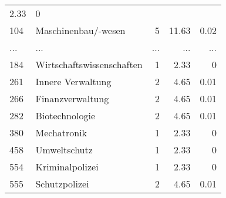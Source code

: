 \begin{longtable}{lXrrr}
          \num[round-mode=places,round-precision=2]{2.33} &
          \num[round-mode=places,round-precision=2]{0} \\
        104 & \multicolumn{1}{X}{Maschinenbau/-wesen} & %
          \num{5} &
          \num[round-mode=places,round-precision=2]{11.63} &
          \num[round-mode=places,round-precision=2]{0.02} \\
       ... & ... & ... & ... & ... \\
        184 & \multicolumn{1}{X}{Wirtschaftswissenschaften} & %
          \num{1} &
          \num[round-mode=places,round-precision=2]{2.33} &
          \num[round-mode=places,round-precision=2]{0} \\

        261 & \multicolumn{1}{X}{Innere Verwaltung} & %
          \num{2} &
          \num[round-mode=places,round-precision=2]{4.65} &
          \num[round-mode=places,round-precision=2]{0.01} \\

        266 & \multicolumn{1}{X}{Finanzverwaltung} & %
          \num{2} &
          \num[round-mode=places,round-precision=2]{4.65} &
          \num[round-mode=places,round-precision=2]{0.01} \\

        282 & \multicolumn{1}{X}{Biotechnologie} & %
          \num{2} &
          \num[round-mode=places,round-precision=2]{4.65} &
          \num[round-mode=places,round-precision=2]{0.01} \\

        380 & \multicolumn{1}{X}{Mechatronik} & %
          \num{1} &
          \num[round-mode=places,round-precision=2]{2.33} &
          \num[round-mode=places,round-precision=2]{0} \\

        458 & \multicolumn{1}{X}{Umweltschutz} & %
          \num{1} &
          \num[round-mode=places,round-precision=2]{2.33} &
          \num[round-mode=places,round-precision=2]{0} \\

        554 & \multicolumn{1}{X}{Kriminalpolizei} & %
          \num{1} &
          \num[round-mode=places,round-precision=2]{2.33} &
          \num[round-mode=places,round-precision=2]{0} \\

        555 & \multicolumn{1}{X}{Schutzpolizei} & %
          \num{2} &
          \num[round-mode=places,round-precision=2]{4.65} &
          \num[round-mode=places,round-precision=2]{0.01} \\


\end{longtable}
